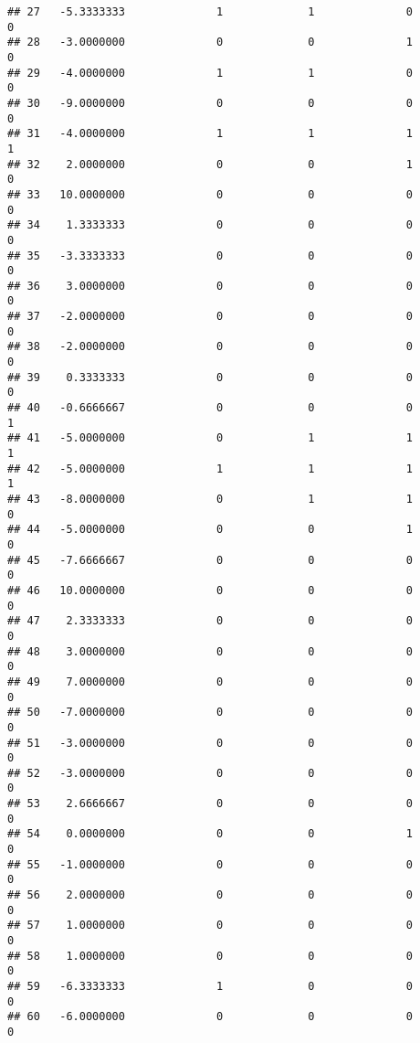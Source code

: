 \documentclass[
]{article}
\begin{document}
\begin{verbatim}
## 27   -5.3333333              1             1              0             0
## 28   -3.0000000              0             0              1             0
## 29   -4.0000000              1             1              0             0
## 30   -9.0000000              0             0              0             0
## 31   -4.0000000              1             1              1             1
## 32    2.0000000              0             0              1             0
## 33   10.0000000              0             0              0             0
## 34    1.3333333              0             0              0             0
## 35   -3.3333333              0             0              0             0
## 36    3.0000000              0             0              0             0
## 37   -2.0000000              0             0              0             0
## 38   -2.0000000              0             0              0             0
## 39    0.3333333              0             0              0             0
## 40   -0.6666667              0             0              0             1
## 41   -5.0000000              0             1              1             1
## 42   -5.0000000              1             1              1             1
## 43   -8.0000000              0             1              1             0
## 44   -5.0000000              0             0              1             0
## 45   -7.6666667              0             0              0             0
## 46   10.0000000              0             0              0             0
## 47    2.3333333              0             0              0             0
## 48    3.0000000              0             0              0             0
## 49    7.0000000              0             0              0             0
## 50   -7.0000000              0             0              0             0
## 51   -3.0000000              0             0              0             0
## 52   -3.0000000              0             0              0             0
## 53    2.6666667              0             0              0             0
## 54    0.0000000              0             0              1             0
## 55   -1.0000000              0             0              0             0
## 56    2.0000000              0             0              0             0
## 57    1.0000000              0             0              0             0
## 58    1.0000000              0             0              0             0
## 59   -6.3333333              1             0              0             0
## 60   -6.0000000              0             0              0             0

\end{verbatim}
\end{document}
